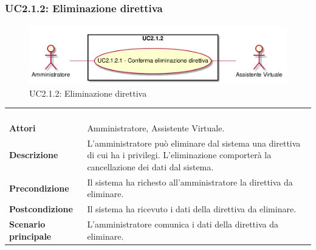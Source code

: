 \newpage\subsubsection{UC2.1.2: Eliminazione direttiva }
\label{UC2.1.2}
\begin{figure}[h]
	\centering
	\includegraphics[width=\textwidth,height=\textheight,keepaspectratio]{images/UseCaseUC212.png}
	\caption{UC2.1.2: Eliminazione direttiva }
\end{figure}
\begin{longtable}{l|p{10cm}}
	\rowcolor[gray]{0.8} \multicolumn{2}{c}{} \\
	\rowcolor[gray]{0.8} \multicolumn{2}{c}{\textbf{UC2.1.2 - Eliminazione direttiva }} \\
	\rowcolor[gray]{0.8} \multicolumn{2}{c}{} \\
	\hline
	&\\
	\textbf{Attori} & Amministratore, Assistente Virtuale.\\[7pt]
	\textbf{Descrizione} & L'amministratore può eliminare dal sistema una direttiva di cui ha i privilegi. L'eliminazione comporterà la cancellazione dei dati dal sistema.\\[7pt]
	\textbf{Precondizione} & Il sistema ha richesto all'amministratore la direttiva da eliminare.\\[7pt]
	\textbf{Postcondizione} & Il sistema ha ricevuto i dati della direttiva da eliminare.\\[7pt]
	\textbf{Scenario principale} &L'amministratore comunica i dati della direttiva da eliminare.\\[7pt]\hline
\end{longtable}

